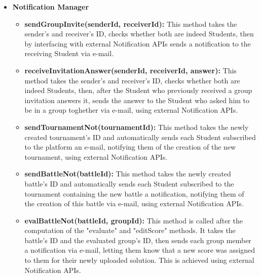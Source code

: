 \documentclass{article}
\begin{document}
{\begin{itemize}
\begin{itemize}
        This method will also be invoked when a battle is closed, so that badges will be granted also on the last commits made by each group.
        \item \textbf{getBadges(userId):} This methods takes the user's ID, checks if the user is a Student by interacting with the DBMS and, 
        if the user is indeed a Student, returns all the badges he achieved while using the platform.
        If the user is not a Student or an error occurs while interacting with the DBMS, an error page will be displayed.
    \end{itemize}
    \item \textbf{Notification Manager}
    \begin{itemize}
        \item \textbf{sendGroupInvite(senderId, receiverId):} This method takes the sender's and receiver's ID, checks whether both are indeed Students, then by interfacing 
        with external Notification APIs sends a notification to the receiving Student via e-mail.
        \item \textbf{receiveInvitationAnswer(senderId, receiverId, answer):} This method takes the sender's and receiver's ID, checks whether both are indeed Students, then,
        after the Student who previously received a group invitation answers it, sends the answer to the Student who asked him to be in a group toghether via e-mail, using
        external Notification APIs.
        \item \textbf{sendTournamentNot(tournamentId):} This method takes the newly created tournament's ID and automatically sends each Student subscribed to the platform an 
        e-mail, notifying them of the creation of the new tournament, using external Notification APIs. 
        \item \textbf{sendBattleNot(battleId):} This method takes the newly created battle's ID and automatically sends each Student subscribed to the tournament containing the 
        new battle a notification, notifying them of the creation of this battle via e-mail, using external Notification APIs.
        \item \textbf{evalBattleNot(battleId, groupId):} This method is called after the computation of the "evaluate" and "editScore" methods. It takes the battle's ID and 
        the evaluated group's ID, then sends each group member a notification via e-mail, letting them know that a new score was assigned to them for their newly
        uploaded solution. This is achieved using external Notification APIs.

\end{itemize}
\end{itemize}}
\end{document}
